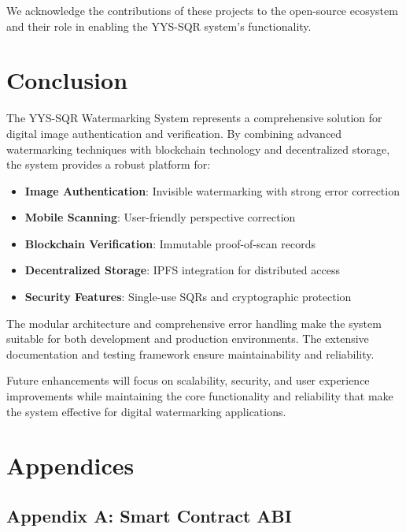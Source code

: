 \documentclass[12pt,a4paper]{article}
\begin{document}
We acknowledge the contributions of these projects to the open-source ecosystem and their role in enabling the YYS-SQR system's functionality.

\section{Conclusion}

The YYS-SQR Watermarking System represents a comprehensive solution for digital image authentication and verification. By combining advanced watermarking techniques with blockchain technology and decentralized storage, the system provides a robust platform for:

\begin{itemize}
    \item \textbf{Image Authentication}: Invisible watermarking with strong error correction
    \item \textbf{Mobile Scanning}: User-friendly perspective correction
    \item \textbf{Blockchain Verification}: Immutable proof-of-scan records
    \item \textbf{Decentralized Storage}: IPFS integration for distributed access
    \item \textbf{Security Features}: Single-use SQRs and cryptographic protection
\end{itemize}

The modular architecture and comprehensive error handling make the system suitable for both development and production environments. The extensive documentation and testing framework ensure maintainability and reliability.

Future enhancements will focus on scalability, security, and user experience improvements while maintaining the core functionality and reliability that make the system effective for digital watermarking applications.

\section{Appendices}

\subsection{Appendix A: Smart Contract ABI}
\end{document}
